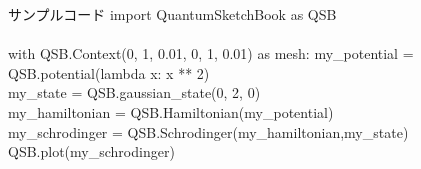 \documentclass[a4paper, lualatex]{bxjsarticle}
\begin{document}
\begin{section}{サンプルコード}
    import QuantumSketchBook as QSB\\\\
        with QSB.Context(0, 1, 0.01, 0, 1, 0.01) as mesh:%
        \s\s\s\s my_potential = QSB.potential(lambda x: x ** 2)\\
        \s\s\s\s my_state = QSB.gaussian_state(0, 2, 0)\\
        \s\s\s\s my_hamiltonian = QSB.Hamiltonian(my_potential)\\
        \s\s\s\s my_schrodinger = QSB.Schrodinger(my_hamiltonian,\s my_state)\\
        \s\s\s\s QSB.plot(my_schrodinger)\\
    
\end{section}
\end{document}
